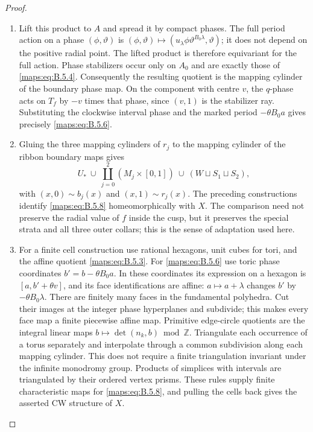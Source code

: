 \begin{proof}
\begin{enumerate}[label=\arabic*.,leftmargin=*]
\item Lift this product to $A$ and spread it by compact phases.
The full period action on a phase $(\phi,\vartheta)$ is
$(\phi,\vartheta)\mapsto
(u_\lambda\phi\vartheta^{B_0\lambda},\vartheta)$;
it does not depend on the positive radial point.  The
lifted product is therefore equivariant for the full
action.  Phase stabilizers occur only on $A_0$ and are
exactly those of \eqref{maps:eq:B.5.4}.  Consequently the resulting
quotient is the mapping cylinder of the boundary phase
map.  On the component with centre $v$, the $q$-phase
acts on $T_f$ by $-v$ times that phase, since $(v,1)$ is
the stabilizer ray.  Substituting the clockwise interval
phase and the marked period $-\theta B_0a$ gives precisely
\eqref{maps:eq:B.5.6}.

\item Gluing the three mapping cylinders of $r_j$ to the
mapping cylinder of the ribbon boundary maps gives
\[
 U_*\ \cup\ \coprod_{j=0}^2(M_j\times[0,1])
       \ \cup\ (W\sqcup S_1\sqcup S_2),
 \tag{B.5.8}\label{maps:eq:B.5.8}
\]
with $(x,0)\sim b_j(x)$ and $(x,1)\sim r_j(x)$.
The preceding constructions identify \eqref{maps:eq:B.5.8}
homeomorphically with $X$.  The comparison need not
preserve the radial value of $f$ inside the cusp, but
it preserves the special strata and all three outer
collars; this is the sense of adaptation used here.

\item For a finite cell construction use rational hexagons,
unit cubes for tori, and the affine quotient \eqref{maps:eq:B.5.3}.
For \eqref{maps:eq:B.5.6} use toric phase coordinates
$b'=b-\theta B_0a$.  In these coordinates its expression
on a hexagon is $[a,b'+\theta v]$, and its face
identifications are affine:
$a\mapsto a+\lambda$ changes $b'$ by
$-\theta B_0\lambda$.  There are finitely many faces
in the fundamental polyhedra.  Cut their images at the
integer phase hyperplanes and subdivide; this makes
every face map a finite piecewise affine map.  Primitive
edge-circle quotients are the integral linear maps
$b\mapsto\det(n_k,b)\bmod\mathbb Z$.
Triangulate each occurrence of a torus separately and
interpolate through a common subdivision along each
mapping cylinder.  This does not require a finite
triangulation invariant under the infinite monodromy
group.  Products of simplices with intervals are
triangulated by their ordered vertex prisms.  These
rules supply finite characteristic maps for \eqref{maps:eq:B.5.8},
and pulling the cells back gives the asserted CW
structure of $X$.


\end{enumerate}
\end{proof}
